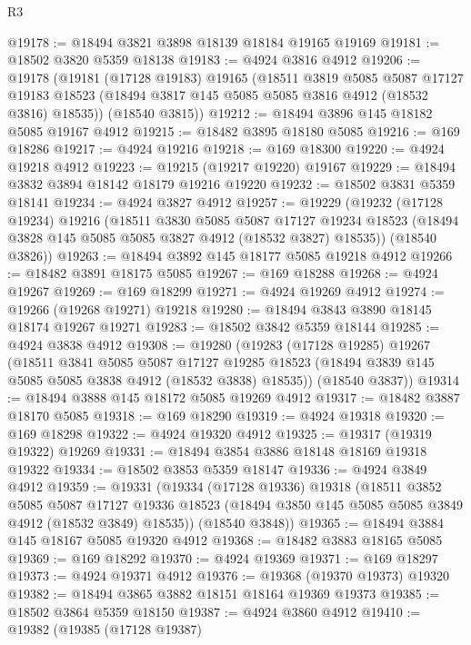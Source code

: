 \begin{lexlean}{R3}
\begin{coremodule}
@19178 := @18494 @3821 @3898 @18139 @18184 @19165 @19169
@19181 := @18502 @3820 @5359 @18138
@19183 := @4924 @3816 @4912
@19206 := @19178
    (@19181
      (@17128 @19183)
      @19165
      (@18511
        @3819
        @5085
        @5087
        @17127
        @19183
        @18523
        (@18494 @3817 @145 @5085 @5085 @3816 @4912 (@18532 @3816) @18535))
      (@18540 @3815))
@19212 := @18494 @3896 @145 @18182 @5085 @19167 @4912
@19215 := @18482 @3895 @18180 @5085
@19216 := @169 @18286
@19217 := @4924 @19216
@19218 := @169 @18300
@19220 := @4924 @19218 @4912
@19223 := @19215 (@19217 @19220) @19167
@19229 := @18494 @3832 @3894 @18142 @18179 @19216 @19220
@19232 := @18502 @3831 @5359 @18141
@19234 := @4924 @3827 @4912
@19257 := @19229
    (@19232
      (@17128 @19234)
      @19216
      (@18511
        @3830
        @5085
        @5087
        @17127
        @19234
        @18523
        (@18494 @3828 @145 @5085 @5085 @3827 @4912 (@18532 @3827) @18535))
      (@18540 @3826))
@19263 := @18494 @3892 @145 @18177 @5085 @19218 @4912
@19266 := @18482 @3891 @18175 @5085
@19267 := @169 @18288
@19268 := @4924 @19267
@19269 := @169 @18299
@19271 := @4924 @19269 @4912
@19274 := @19266 (@19268 @19271) @19218
@19280 := @18494 @3843 @3890 @18145 @18174 @19267 @19271
@19283 := @18502 @3842 @5359 @18144
@19285 := @4924 @3838 @4912
@19308 := @19280
    (@19283
      (@17128 @19285)
      @19267
      (@18511
        @3841
        @5085
        @5087
        @17127
        @19285
        @18523
        (@18494 @3839 @145 @5085 @5085 @3838 @4912 (@18532 @3838) @18535))
      (@18540 @3837))
@19314 := @18494 @3888 @145 @18172 @5085 @19269 @4912
@19317 := @18482 @3887 @18170 @5085
@19318 := @169 @18290
@19319 := @4924 @19318
@19320 := @169 @18298
@19322 := @4924 @19320 @4912
@19325 := @19317 (@19319 @19322) @19269
@19331 := @18494 @3854 @3886 @18148 @18169 @19318 @19322
@19334 := @18502 @3853 @5359 @18147
@19336 := @4924 @3849 @4912
@19359 := @19331
    (@19334
      (@17128 @19336)
      @19318
      (@18511
        @3852
        @5085
        @5087
        @17127
        @19336
        @18523
        (@18494 @3850 @145 @5085 @5085 @3849 @4912 (@18532 @3849) @18535))
      (@18540 @3848))
@19365 := @18494 @3884 @145 @18167 @5085 @19320 @4912
@19368 := @18482 @3883 @18165 @5085
@19369 := @169 @18292
@19370 := @4924 @19369
@19371 := @169 @18297
@19373 := @4924 @19371 @4912
@19376 := @19368 (@19370 @19373) @19320
@19382 := @18494 @3865 @3882 @18151 @18164 @19369 @19373
@19385 := @18502 @3864 @5359 @18150
@19387 := @4924 @3860 @4912
@19410 := @19382
    (@19385
      (@17128 @19387)

\end{coremodule}
\end{lexlean}
